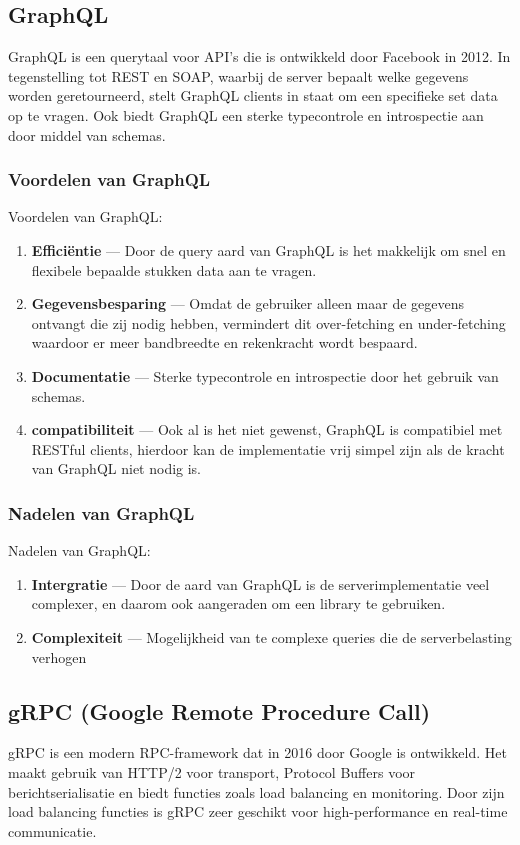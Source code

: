 \subsection{GraphQL}
GraphQL is een querytaal voor API's die is ontwikkeld door Facebook in 2012\cite{facebook}.
In tegenstelling tot REST en SOAP, waarbij de server bepaalt welke gegevens
worden geretourneerd, stelt GraphQL clients in staat om een specifieke set data
op te vragen. Ook biedt GraphQL een sterke typecontrole en introspectie aan door
middel van schemas.\cite{Hartig}

\subsubsection{Voordelen van GraphQL}
Voordelen van GraphQL:
\begin{enumerate}
    \item \textbf{Efficiëntie} --- Door de query aard van GraphQL is het
     makkelijk om snel en flexibele bepaalde stukken data aan te vragen.
    \item \textbf{Gegevensbesparing} --- Omdat de gebruiker alleen maar de
     gegevens ontvangt die zij nodig hebben, vermindert dit over-fetching en
     under-fetching waardoor er meer bandbreedte en rekenkracht wordt bespaard.\cite{Hartig}
    \item \textbf{Documentatie} --- Sterke typecontrole en introspectie door het
     gebruik van schemas.
     \item \textbf{compatibiliteit} --- Ook al is het niet gewenst, GraphQL
      is compatibiel met RESTful clients, hierdoor kan de implementatie vrij
      simpel zijn als de kracht van GraphQL niet nodig is.
\end{enumerate}

\subsubsection{Nadelen van GraphQL}
Nadelen van GraphQL:
\begin{enumerate}
    \item \textbf{Intergratie} --- Door de aard van GraphQL is de
     serverimplementatie veel complexer, en daarom ook aangeraden om een library
     te gebruiken.
    \item \textbf{Complexiteit} --- Mogelijkheid van te complexe queries die
     de serverbelasting verhogen
\end{enumerate}

\subsection{gRPC (Google Remote Procedure Call)}
gRPC is een modern RPC-framework dat in 2016 door Google is ontwikkeld. Het maakt
gebruik van HTTP/2 voor transport, Protocol Buffers voor berichtserialisatie en
biedt functies zoals load balancing en monitoring. Door zijn load balancing
functies is gRPC zeer geschikt voor high-performance en real-time communicatie.\cite{google,Śliwa_Pańczyk_2021}

